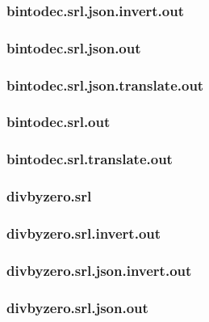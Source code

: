 \subsubsection{bintodec.srl.json.invert.out}
\label{app:bintodec_srl.json.invert.out}

\subsubsection{bintodec.srl.json.out}
\label{app:bintodec_srl.json.out}

\subsubsection{bintodec.srl.json.translate.out}
\label{app:bintodec_srl.json.translate.out}

\subsubsection{bintodec.srl.out}
\label{app:bintodec_srl.out}

\subsubsection{bintodec.srl.translate.out}
\label{app:bintodec_srl.translate.out}

\subsubsection{divbyzero.srl}
\label{app:divbyzero_srl}

\subsubsection{divbyzero.srl.invert.out}
\label{app:divbyzero_srl.invert.out}

\subsubsection{divbyzero.srl.json.invert.out}
\label{app:divbyzero_srl.json.invert.out}

\subsubsection{divbyzero.srl.json.out}
\label{app:divbyzero_srl.json.out}

